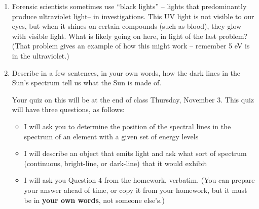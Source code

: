\documentclass[12pt]{article}
\begin{document}
\begin{enumerate}
		\vspace{1.3in}
		
		\item Forensic scientists sometimes use ``black lights'' -- lights that predominantly produce ultraviolet light-- in investigations. This UV light is not visible to our eyes, but when it shines on certain compounds 
		(such as blood), they glow with visible light. What is likely going on here, in light of the last problem? (That problem gives an example of how this might work -- remember 5 eV is in the ultraviolet.)
		
		\vspace{1.3in}
		
		\item Describe in a few sentences, in your own words, how the dark lines in the Sun's spectrum tell us what the Sun is made of.
		
		\vspace{2in}
		
		\it
		
		Your quiz on this will be at the end of class Thursday, November 3. This quiz will have three questions, as follows:
		
		\begin{itemize}
						\item I will ask you to determine the position of the spectral lines in the spectrum of an element with a given set of energy levels
						\item I will describe an object that emits light and ask what sort of spectrum (continuous, bright-line, or dark-line) that it would exhibit
			            \item I will ask you Question 4 from the homework, verbatim. (You can prepare your answer ahead of time, or copy it from your homework, but it must be in {\bf your own words}, not someone else's.)
		\end{itemize}
	\end{enumerate}
\end{document}
